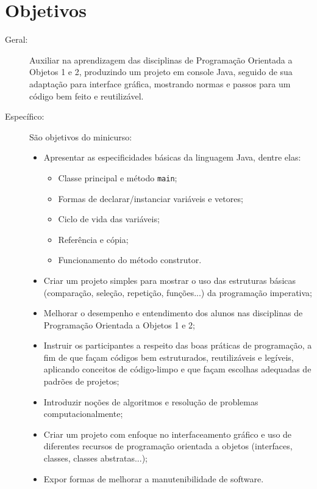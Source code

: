 \documentclass{article}
\begin{document}
\section{Objetivos}
\begin{description}
    \item[Geral:] Auxiliar na aprendizagem das disciplinas de
        Programação Orientada a Objetos 1 e 2, produzindo um projeto em
        console Java, seguido de sua adaptação para interface gráfica,
        mostrando normas e passos para um código bem feito e
        reutilizável.
    \item[Específico:] São objetivos do minicurso:
        \begin{itemize}[label={-}]
            \item Apresentar as especificidades básicas da linguagem
                Java, dentre elas:
                \begin{itemize}[label={-}]
                    \item Classe principal e método \texttt{main};
                    \item Formas de declarar/instanciar variáveis e
                        vetores;
                    \item Ciclo de vida das variáveis;
                    \item Referência e cópia;
                    \item Funcionamento do método construtor.
                \end{itemize}
            \item Criar um projeto simples para mostrar o uso das
                estruturas básicas (comparação, seleção, repetição,
                funções...) da programação imperativa;
            \item Melhorar o desempenho e entendimento dos alunos nas
                disciplinas de Programação Orientada a Objetos 1 e 2;
            \item Instruir os participantes a respeito das boas
                práticas de programação, a fim de que façam códigos bem
                estruturados, reutilizáveis e legíveis, aplicando
                conceitos de código-limpo e que façam escolhas
                adequadas de padrões de projetos;
            \item Introduzir noções de algoritmos e resolução de
                problemas computacionalmente;
            \item Criar um projeto com enfoque no interfaceamento
                gráfico e uso de diferentes recursos de programação
                orientada a objetos (interfaces, classes, classes
                abstratas...);
            \item Expor formas de melhorar a manutenibilidade de
                software.
        \end{itemize}
\end{description}
\end{document}
